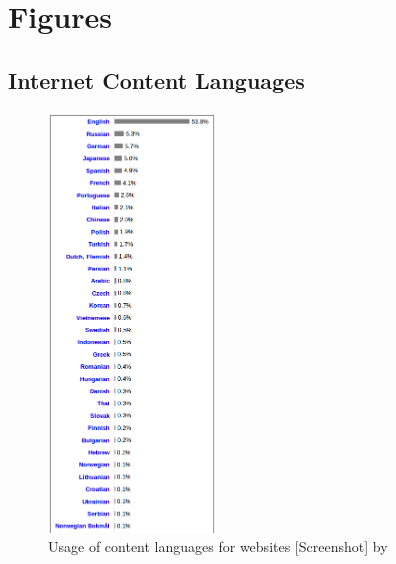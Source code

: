 \chapter{Figures}

\section{Internet Content Languages}

\begin{figure}[H]
	\centering
	\includegraphics[height=30em]{diagrams/w3techsInternetContentLang.png}
	\caption{Usage of content languages for websites [Screenshot] by \citet{appendixDia:01}}
	\label{fig:w3techLang}
\end{figure}

